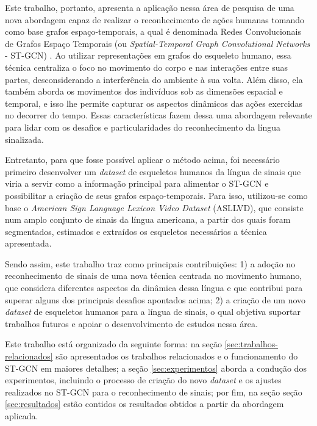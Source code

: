 Este trabalho, portanto, apresenta a aplicação nessa área de pesquisa de uma nova abordagem capaz de realizar o reconhecimento de ações humanas tomando como base grafos espaço-temporais, a qual é denominada Redes Convolucionais de Grafos Espaço Temporais (ou \textit{Spatial-Temporal Graph Convolutional Networks} - ST-GCN) \cite{st-gcn-2018}.
Ao utilizar representações em grafos do esqueleto humano, essa técnica centraliza o foco no movimento do corpo e nas interações entre suas partes, desconsiderando a interferência do ambiente à sua volta. Além disso, ela também aborda os movimentos dos indivíduos sob as dimensões espacial e temporal, e isso lhe permite capturar os aspectos dinâmicos das ações exercidas no decorrer do tempo. Essas características fazem dessa uma abordagem relevante para lidar com os desafios e particularidades do reconhecimento da língua sinalizada.

Entretanto, para que fosse possível aplicar o método acima, foi necessário primeiro desenvolver um \textit{dataset} de esqueletos humanos da língua de sinais que viria a servir como a informação principal para alimentar o ST-GCN e possibilitar a criação de seus grafos espaço-temporais. Para isso, utilizou-se como base o \textit{American Sign Language Lexicon Video Dataset} (ASLLVD), que consiste num amplo conjunto de sinais da língua americana, a partir dos quais foram segmentados, estimados e extraídos os esqueletos necessários a técnica apresentada.

Sendo assim, este trabalho traz como principais contribuições: 1) a adoção no reconhecimento de sinais de uma nova técnica centrada no movimento humano, que considera diferentes aspectos da dinâmica dessa língua e que contribui para superar alguns dos principais desafios apontados acima; 2) a criação de um novo \textit{dataset} de esqueletos humanos para a língua de sinais, o qual objetiva suportar trabalhos futuros e apoiar o desenvolvimento de estudos nessa área.

Este trabalho está organizado da seguinte forma: na seção \ref{sec:trabalhos-relacionados} são apresentados os trabalhos relacionados e o funcionamento do ST-GCN em maiores detalhes; a seção \ref{sec:experimentos} aborda a condução dos experimentos, incluindo o processo de criação do novo \textit{dataset} e os ajustes realizados no ST-GCN para o reconhecimento de sinais; por fim, na seção seção \ref{sec:resultados} estão contidos os resultados obtidos a partir da abordagem aplicada.




